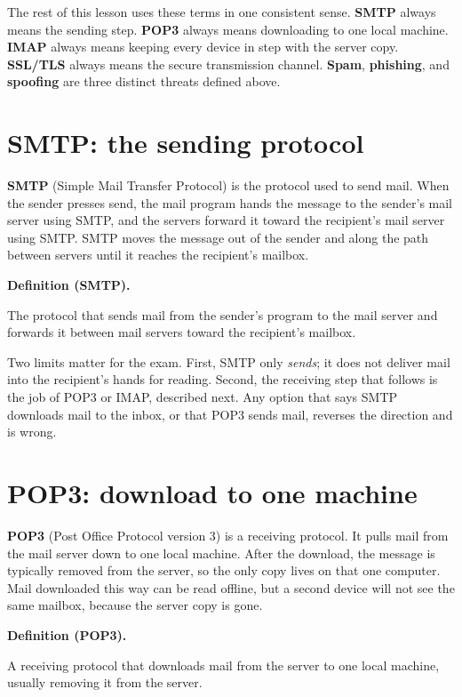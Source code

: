 \documentclass[11pt]{article}
\newenvironment{definitionbox}[1]{%
  \par\noindent\textbf{Definition (#1).}\ \itshape
}{\par\vspace{0.3em}}
\begin{document}
The rest of this lesson uses these terms in one consistent sense.
\textbf{SMTP} always means the sending step. \textbf{POP3} always means
downloading to one local machine. \textbf{IMAP} always means keeping every
device in step with the server copy. \textbf{SSL/TLS} always means the
secure transmission channel. \textbf{Spam}, \textbf{phishing}, and
\textbf{spoofing} are three distinct threats defined above.

\section{SMTP: the sending protocol}
\textbf{SMTP} (Simple Mail Transfer Protocol) is the protocol used to send
mail. When the sender presses send, the mail program hands the message to
the sender's mail server using SMTP, and the servers forward it toward the
recipient's mail server using SMTP. SMTP moves the message out of the
sender and along the path between servers until it reaches the recipient's
mailbox.

\begin{definitionbox}{SMTP}
The protocol that sends mail from the sender's program to the mail server
and forwards it between mail servers toward the recipient's mailbox.
\end{definitionbox}

Two limits matter for the exam. First, SMTP only \emph{sends}; it does not
deliver mail into the recipient's hands for reading. Second, the receiving
step that follows is the job of POP3 or IMAP, described next. Any option
that says SMTP downloads mail to the inbox, or that POP3 sends mail,
reverses the direction and is wrong.

\section{POP3: download to one machine}
\textbf{POP3} (Post Office Protocol version 3) is a receiving protocol.
It pulls mail from the mail server down to one local machine. After the
download, the message is typically removed from the server, so the only
copy lives on that one computer. Mail downloaded this way can be read
offline, but a second device will not see the same mailbox, because the
server copy is gone.

\begin{definitionbox}{POP3}
A receiving protocol that downloads mail from the server to one local
machine, usually removing it from the server.
\end{definitionbox}
\end{document}

